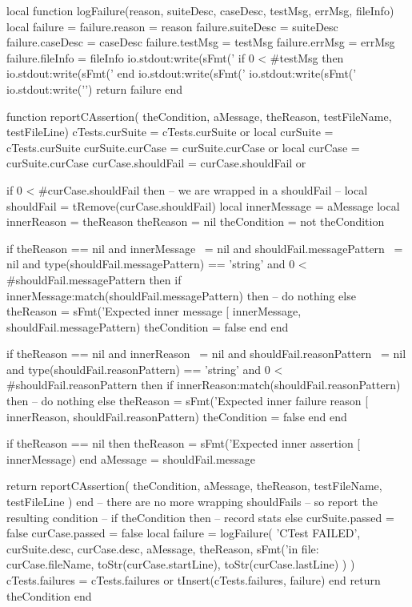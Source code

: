 local function logFailure(reason, suiteDesc, caseDesc,
                          testMsg, errMsg, fileInfo)
  local failure = {}
  failure.reason    = reason
  failure.suiteDesc = suiteDesc
  failure.caseDesc  = caseDesc
  failure.testMsg   = testMsg
  failure.errMsg    = errMsg
  failure.fileInfo  = fileInfo
  io.stdout:write(sFmt('    %
  if 0 < #testMsg then
    io.stdout:write(sFmt('    %
  end
  io.stdout:write(sFmt('    %
  io.stdout:write(sFmt('    %
  io.stdout:write('\n\n')
  return failure
end

function reportCAssertion(
  theCondition, aMessage, theReason,
  testFileName, testFileLine)
  cTests.curSuite    = cTests.curSuite or { }
  local curSuite     = cTests.curSuite
  curSuite.curCase   = curSuite.curCase or { }
  local curCase      = curSuite.curCase
  curCase.shouldFail = curCase.shouldFail or { }
  
  if 0 < #curCase.shouldFail then
    -- we are wrapped in a shouldFail
    --
    local shouldFail   = tRemove(curCase.shouldFail)
    local innerMessage = aMessage
    local innerReason  = theReason
    theReason          = nil
    theCondition       = not theCondition
  
    if theReason == nil
      and innerMessage ~= nil
      and shouldFail.messagePattern ~= nil
      and type(shouldFail.messagePattern) == 'string'
      and 0 < #shouldFail.messagePattern then
      if innerMessage:match(shouldFail.messagePattern) then
        -- do nothing
      else
        theReason = sFmt('Expected inner message [%
          innerMessage, shouldFail.messagePattern)
        theCondition = false
      end
    end

    if theReason == nil
      and innerReason ~= nil
      and shouldFail.reasonPattern ~= nil
      and type(shouldFail.reasonPattern) == 'string'
      and 0 < #shouldFail.reasonPattern then
      if innerReason:match(shouldFail.reasonPattern) then
        -- do nothing
      else
        theReason = sFmt('Expected inner failure reason [%
          innerReason, shouldFail.reasonPattern)
        theCondition = false
      end
    end
    
    if theReason == nil then
      theReason = sFmt('Expected inner assertion [%
        innerMessage)
    end
    aMessage = shouldFail.message
    
    return reportCAssertion(
      theCondition,
      aMessage,
      theReason,
      testFileName,
      testFileLine
    )
  end
  -- there are no more wrapping shouldFails
  -- so report the resulting condition
  --
  if theCondition then
    -- record stats
  else
    curSuite.passed = false
    curCase.passed  = false
    local failure = logFailure(
      'CTest FAILED',
      curSuite.desc,
      curCase.desc,
      aMessage,
      theReason,
      sFmt('in file: %
        curCase.fileName,
        toStr(curCase.startLine),
        toStr(curCase.lastLine)
      )
    )
    cTests.failures = cTests.failures or { }
    tInsert(cTests.failures, failure)
  end
  return theCondition
end
\stopLuaCode

